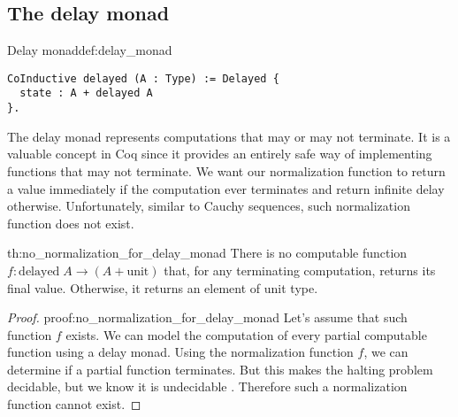 \subsection{The delay monad}
\begin{defi}{Delay monad}{def:delay_monad}
\begin{verbatim}
CoInductive delayed (A : Type) := Delayed {
  state : A + delayed A
}.
\end{verbatim}
\end{defi}
The delay monad \cite{DelayedMonad} represents computations that may or may not terminate. It is a valuable concept in Coq since it provides an entirely safe way of implementing functions that may not terminate. We want our normalization function to return a value immediately if the computation ever terminates and return infinite delay otherwise. Unfortunately, similar to Cauchy sequences, such normalization function does not exist.
\begin{theo}{}{th:no_normalization_for_delay_monad}
There is no computable function $f: \textrm{delayed} \; A \rightarrow (A + \textrm{unit})$ that, for any terminating computation, returns its final value. Otherwise, it returns an element of unit type.
\end{theo}
\begin{proof}{}{proof:no_normalization_for_delay_monad}
Let's assume that such function $f$ exists. We can model the computation of every partial computable function using a delay monad. Using the normalization function $f$, we can determine if a partial function terminates. But this makes the halting problem decidable, but we know it is undecidable \cite{Undecidable}. Therefore such a normalization function cannot exist. \contradiction
\end{proof}
